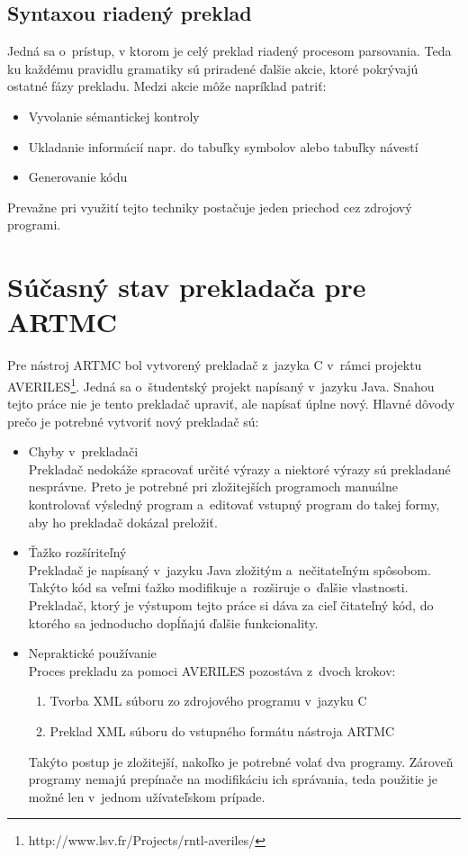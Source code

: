 \section{Syntaxou riadený preklad}
\label{sec_synta}
Jedná sa o~prístup, v ktorom je celý preklad riadený procesom parsovania. Teda ku každému pravidlu gramatiky sú priradené ďalšie akcie, ktoré pokrývajú ostatné fázy prekladu. Medzi akcie môže napríklad patriť:
\begin{itemize}
    \item Vyvolanie sémantickej kontroly
    \item Ukladanie informácií napr. do tabuľky symbolov alebo tabuľky návestí
    \item Generovanie kódu
\end{itemize}
Prevažne pri využití tejto techniky postačuje jeden priechod cez zdrojový programi. \cite{aho}


\chapter{Súčasný stav prekladača pre ARTMC}
\label{kap_averiles}
Pre nástroj ARTMC bol vytvorený prekladač z~jazyka C v~rámci projektu AVERILES\footnote{http://www.lsv.fr/Projects/rntl-averiles/}. Jedná sa
o~študentský projekt napísaný v~jazyku Java. Snahou tejto práce nie je tento prekladač
upraviť, ale napísať úplne nový. Hlavné dôvody prečo je potrebné vytvoriť nový
prekladač sú:
\begin{itemize}
    \item Chyby v~prekladači\\
        Prekladač nedokáže spracovať určité výrazy a niektoré výrazy sú prekladané nesprávne.
        Preto je potrebné pri zložitejších programoch manuálne kontrolovať výsledný
        program a~editovať vstupný program do takej formy, aby ho prekladač dokázal
        preložiť.
    \item Ťažko rozšíriteľný\\
        Prekladač je napísaný v~jazyku Java zložitým a~nečitateľným spôsobom. Takýto
        kód sa veľmi ťažko modifikuje a~rozširuje o~ďalšie vlastnosti. Prekladač,
        ktorý je výstupom tejto práce si dáva za cieľ čitateľný kód, do ktorého
        sa jednoducho dopĺňajú ďalšie funkcionality.
    \item Nepraktické používanie\\
        Proces prekladu za pomoci AVERILES pozostáva z~dvoch krokov:
        \begin{enumerate}
            \item Tvorba XML súboru zo zdrojového programu v~jazyku C
            \item Preklad XML súboru do vstupného formátu nástroja ARTMC
        \end{enumerate}
        Takýto postup je zložitejší, nakoľko je potrebné volať dva programy.
        Zároveň programy nemajú prepínače na modifikáciu ich správania, teda
        použitie je možné len v~jednom užívateľskom prípade.
\end{itemize}

